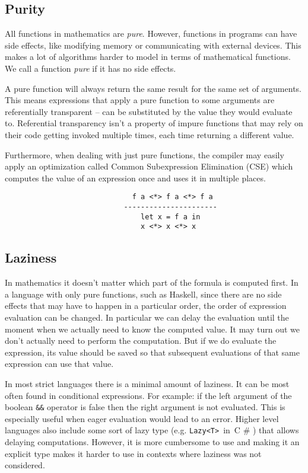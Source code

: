 \documentclass[en]{pracamgr}
\newcommand{\shrp}{%
  {\fontfamily{ppl}\selectfont\#%
  }}
\begin{document}
\subsection{Purity}

All functions in mathematics are \textit{pure}. However, functions
in programs can have side effects, like modifying memory or
communicating with external devices. This makes a lot of
algorithms harder to model in terms of mathematical
functions. We call a function \textit{pure} if it has no
side effects.

A pure function will always return the same result for the
same set of arguments. This means expressions that apply a
pure function to some arguments are referentially
transparent \cite{referentialTransparency} -- can be substituted by the value they would
evaluate to. Referential transparency isn't a property of
impure functions that may rely on their code getting
invoked multiple times, each time returning a different
value.

Furthermore, when dealing with just pure functions, the
compiler may easily apply an optimization called Common
Subexpression Elimination (CSE) which computes the value of
an expression once and uses it in multiple places.

\begin{verbatim}
                              f a <*> f a <*> f a
                            ----------------------
                                let x = f a in
                                x <*> x <*> x
\end{verbatim}

\subsection{Laziness}\label{s:laziness}

In mathematics it doesn't matter which part of the formula
is computed first. In a language with only pure functions,
such as Haskell, since there are no side effects that may
have to happen in a particular order, the order of
expression evaluation can be changed. In particular we can
delay the evaluation until the moment when we actually need
to know the computed value. It may turn out we don't
actually need to perform the computation. But if we do
evaluate the expression, its value should be saved so that
subsequent evaluations of that same expression can use that value.

In most strict languages there is a minimal amount of
laziness. It can be most often found in conditional expressions.
For example: if the left argument of the
boolean \texttt{\&\&} operator is false then the right argument is not
evaluated. This is especially useful when eager evaluation would lead
to an error. Higher level languages also include some sort of lazy
type (e.g. \verb|Lazy<T>|~in~C\shrp) that allows delaying computations.
However, it is more cumbersome to use and making it an explicit type
makes it harder to use in contexts where laziness was not considered.
\end{document}
